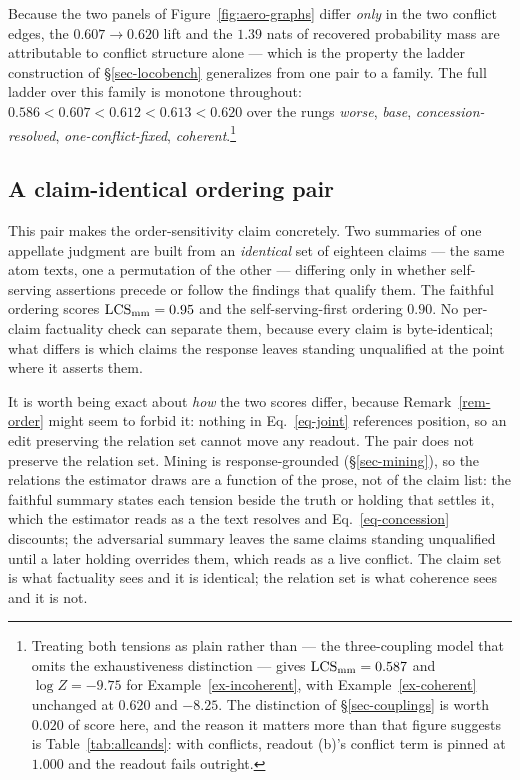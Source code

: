 Because the two panels of Figure~\ref{fig:aero-graphs} differ \emph{only} in the two conflict edges,
the $0.607\to0.620$ lift and the $1.39$ nats of recovered probability mass are attributable to conflict
structure alone --- which is the property the ladder construction of \S\ref{sec-locobench} generalizes
from one pair to a family. The full ladder over this family is monotone throughout:
$0.586 < 0.607 < 0.612 < 0.613 < 0.620$ over the rungs \emph{worse}, \emph{base},
\emph{concession-resolved}, \emph{one-conflict-fixed}, \emph{coherent}.\footnote{Treating both tensions
as plain \con{} rather than \exc{} --- the three-coupling model that omits the exhaustiveness
distinction --- gives $\mathrm{LCS}_{\mathrm{mm}}=0.587$ and $\log Z=-9.75$ for Example~\ref{ex-incoherent}, with
Example~\ref{ex-coherent} unchanged at $0.620$ and $-8.25$. The distinction of \S\ref{sec-couplings} is
worth $0.020$ of score here, and the reason it matters more than that figure suggests is
Table~\ref{tab:allcands}: with \exc{} conflicts, readout (b)'s conflict term is pinned at $1.000$ and
the readout fails outright.}

\subsection{A claim-identical ordering pair}
\label{sec-example-order}

This pair makes the order-sensitivity claim concretely. Two summaries of one appellate
judgment are built from an \emph{identical} set of eighteen claims --- the same atom texts, one a
permutation of the other --- differing only in whether self-serving assertions precede or follow the
findings that qualify them. The faithful ordering scores $\mathrm{LCS}_{\mathrm{mm}}=0.95$ and the
self-serving-first ordering $0.90$. No per-claim factuality check can separate them, because every
claim is byte-identical; what differs is which claims the response leaves standing unqualified at the
point where it asserts them.

It is worth being exact about \emph{how} the two scores differ, because Remark~\ref{rem-order} might
seem to forbid it: nothing in Eq.~\ref{eq-joint} references position, so an edit preserving the
relation set cannot move any readout. The pair does not preserve the relation set. Mining is
response-grounded (\S\ref{sec-mining}), so the relations the estimator draws are a function of the
prose, not of the claim list: the faithful summary states each tension beside the truth or holding
that settles it, which the estimator reads as a  the text resolves and
Eq.~\ref{eq-concession} discounts; the adversarial summary leaves the same claims standing
unqualified until a later holding overrides them, which reads as a live conflict. The claim set is
what factuality sees and it is identical; the relation set is what coherence sees and it is not.

